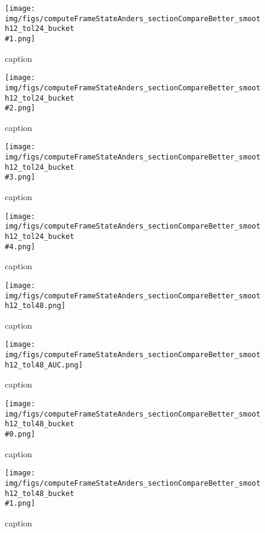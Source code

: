 %
\begin{figure}[!ht]
	\centering
	\texttt{[image: img/figs/computeFrameStateAnders\_sectionCompareBetter\_smooth12\_tol24\_bucket\\\#1.png]}
	\caption{caption}
	\label{fig:computeFrameStateAnders_sectionCompareBetter_smooth12_tol24_bucket\#1.png}
\end{figure}
%
\begin{figure}[!ht]
	\centering
	\texttt{[image: img/figs/computeFrameStateAnders\_sectionCompareBetter\_smooth12\_tol24\_bucket\\\#2.png]}
	\caption{caption}
	\label{fig:computeFrameStateAnders_sectionCompareBetter_smooth12_tol24_bucket\#2.png}
\end{figure}
%
\begin{figure}[!ht]
	\centering
	\texttt{[image: img/figs/computeFrameStateAnders\_sectionCompareBetter\_smooth12\_tol24\_bucket\\\#3.png]}
	\caption{caption}
	\label{fig:computeFrameStateAnders_sectionCompareBetter_smooth12_tol24_bucket\#3.png}
\end{figure}
%
\begin{figure}[!ht]
	\centering
	\texttt{[image: img/figs/computeFrameStateAnders\_sectionCompareBetter\_smooth12\_tol24\_bucket\\\#4.png]}
	\caption{caption}
	\label{fig:computeFrameStateAnders_sectionCompareBetter_smooth12_tol24_bucket\#4.png}
\end{figure}
%
\begin{figure}[!ht]
	\centering
	\texttt{[image: img/figs/computeFrameStateAnders\_sectionCompareBetter\_smooth12\_tol48.png]}
	\caption{caption}
	\label{fig:computeFrameStateAnders_sectionCompareBetter_smooth12_tol48.png}
\end{figure}
%
\begin{figure}[!ht]
	\centering
	\texttt{[image: img/figs/computeFrameStateAnders\_sectionCompareBetter\_smooth12\_tol48\_AUC.png]}
	\caption{caption}
	\label{fig:computeFrameStateAnders_sectionCompareBetter_smooth12_tol48_AUC.png}
\end{figure}
%
\begin{figure}[!ht]
	\centering
	\texttt{[image: img/figs/computeFrameStateAnders\_sectionCompareBetter\_smooth12\_tol48\_bucket\\\#0.png]}
	\caption{caption}
	\label{fig:computeFrameStateAnders_sectionCompareBetter_smooth12_tol48_bucket\#0.png}
\end{figure}
%
\begin{figure}[!ht]
	\centering
	\texttt{[image: img/figs/computeFrameStateAnders\_sectionCompareBetter\_smooth12\_tol48\_bucket\\\#1.png]}
	\caption{caption}
	\label{fig:computeFrameStateAnders_sectionCompareBetter_smooth12_tol48_bucket\#1.png}
\end{figure}
